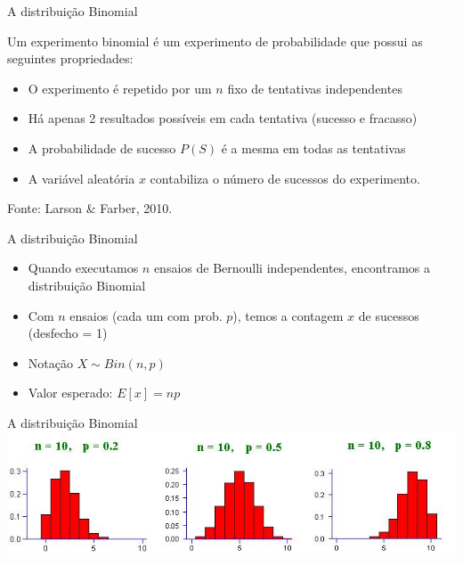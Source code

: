 \documentclass{beamer}
\begin{document}
\begin{frame}{A distribuição Binomial}
  \begin{definition}
    Um \alert{experimento binomial} é um experimento de probabilidade que possui as seguintes propriedades:

    \begin{itemize}
    \item O experimento é repetido por um $n$ fixo de tentativas independentes
    \item Há apenas 2 resultados possíveis em cada tentativa (sucesso e fracasso)
    \item A probabilidade de sucesso $P(S)$ é a mesma em todas as tentativas
    \item A variável aleatória $x$ contabiliza o número de sucessos do experimento.
    \end{itemize}
  \end{definition}

Fonte: Larson \& Farber, 2010.
\end{frame}

\begin{frame}{A distribuição Binomial}
  \begin{itemize}
  \item Quando executamos $n$ ensaios de Bernoulli
    \alert{independentes}, encontramos a distribuição Binomial
  \item Com $n$ ensaios (cada um com prob. $p$), temos a contagem $x$
    de sucessos (desfecho = 1)
  \item Notação $X \sim Bin(n,p)$
  \item Valor esperado: $E[x]=np$
  \end{itemize}
\end{frame}

\begin{frame}{A distribuição Binomial}
\includegraphics[width=\textwidth]{Prob_II/binomial}
\end{frame}
\end{document}
